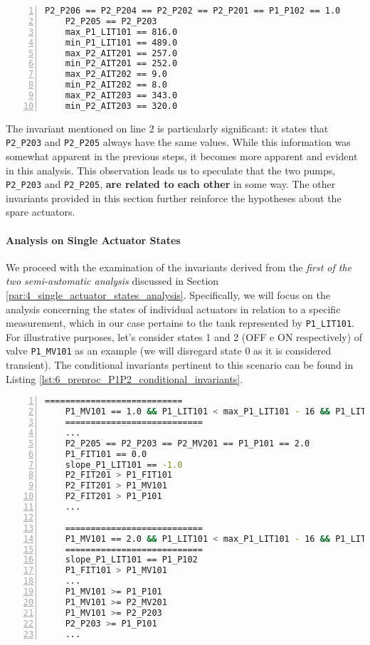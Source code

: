 \begin{lstlisting}[language=bash, numbers=left, caption=General Invariants for PLC1-2, label=lst:6_preproc_P1P2_general_invariants]
	P2_P206 == P2_P204 == P2_P202 == P2_P201 == P1_P102 == 1.0
	P2_P205 == P2_P203
	max_P1_LIT101 == 816.0
	min_P1_LIT101 == 489.0
	max_P2_AIT201 == 257.0
	min_P2_AIT201 == 252.0
	max_P2_AIT202 == 9.0
	min_P2_AIT202 == 8.0
	max_P2_AIT203 == 343.0
	min_P2_AIT203 == 320.0
\end{lstlisting}

The invariant mentioned on line 2 is particularly significant: it states that \texttt{P2\_P203} and \texttt{P2\_P205} always have the same values. While this information was somewhat apparent in the previous steps, it becomes more apparent and evident in this analysis. This observation leads us to speculate that the two pumps, \texttt{P2\_P203} and \texttt{P2\_P205}, \textbf{are related to each other} in some way. The other invariants provided in this section further reinforce the hypotheses about the spare actuators.

\paragraph{Analysis on Single Actuator States}
\label{par:6_P1P2_single_act_states}
We proceed with the examination of the invariants derived from the \textit{first of the two semi-automatic analysis} discussed in Section \ref{par:4_single_actuator_states_analysis}. Specifically, we will focus on the analysis concerning the states of individual actuators in relation to a specific measurement, which in our case pertains to the tank represented by \texttt{P1\_LIT101}. For illustrative purposes, let's consider states 1 and 2 (OFF e ON respectively) of valve \texttt{P1\_MV101} as an example (we will disregard state 0 as it is considered transient). The conditional invariants pertinent to this scenario can be found in Listing \ref{lst:6_preproc_P1P2_conditional_invariants}.

\begin{lstlisting}[language=bash, numbers=left, caption=Conditional Invariants for states 1 and 2 of \texttt{P1\_MV101}, label=lst:6_preproc_P1P2_conditional_invariants]
	===========================
	P1_MV101 == 1.0 && P1_LIT101 < max_P1_LIT101 - 16 && P1_LIT101 > min_P1_LIT101 + 15 
	===========================
	...
	P2_P205 == P2_P203 == P2_MV201 == P1_P101 == 2.0
	P1_FIT101 == 0.0
	slope_P1_LIT101 == -1.0
	P2_FIT201 > P1_FIT101
	P2_FIT201 > P1_MV101
	P2_FIT201 > P1_P101
	...
	
	===========================
	P1_MV101 == 2.0 && P1_LIT101 < max_P1_LIT101 - 16 && P1_LIT101 > min_P1_LIT101 + 15 
	===========================
	slope_P1_LIT101 == P1_P102
	P1_FIT101 > P1_MV101
	...
	P1_MV101 >= P1_P101
	P1_MV101 >= P2_MV201
	P1_MV101 >= P2_P203
	P2_P203 >= P1_P101
	...
\end{lstlisting}

